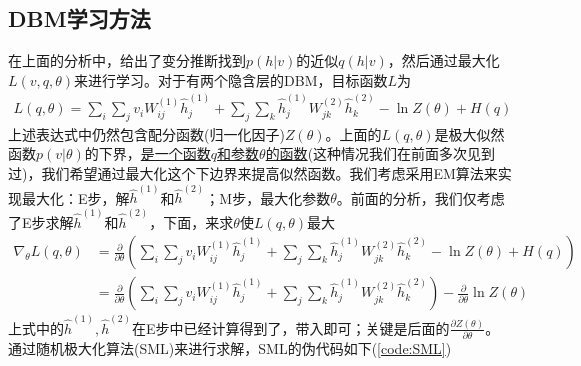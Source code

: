     \subsection{DBM学习方法}
        \par
        在上面的分析中，给出了变分推断找到$p(h|v)$的近似$q(h|v)$，然后通过最大化$L(v,q,\theta)$来进行学习。对于有两个隐含层的DBM，目标函数$L$为
        \begin{align*}
        L(q,\theta) = \sum_i\sum_j v_iW_{i{j}}^{(1)}\hat{h}_j^{(1)} + \sum_j\sum_k\hat{h}_j^{(1)} W_{jk}^{(2)} \hat{h}_k^{(2)} - \ln Z(\theta) + H(q)
        \end{align*}
        上述表达式中仍然包含配分函数(归一化因子)$Z(\theta)$。上面的$L(q,\theta)$是极大似然函数$p(v|\theta)$的下界，\underline{是一个函数$q$和参数$\theta$的函数}(这种情况我们在前面多次见到过)，我们希望通过最大化这个下边界来提高似然函数。我们考虑采用EM算法来实现最大化：E步，解$\hat{h}^{(1)}$和$\hat{h}^{(2)}$；M步，最大化参数$\theta$。前面的分析，我们仅考虑了E步求解$\hat{h}^{(1)}$和$\hat{h}^{(2)}$，下面，来求$\theta$使$L(q,\theta)$最大
        \begin{align*}
        \nabla _\theta L(q,\theta) & = \frac{\partial }{\partial \theta} \left(\sum_i\sum_j v_iW_{i{j}}^{(1)}\hat{h}_j^{(1)} + \sum_j\sum_k\hat{h}_j^{(1)} W_{jk}^{(2)} \hat{h}_k^{(2)} - \ln Z(\theta) + H(q)\right) \\
        & = \frac{\partial }{\partial \theta} \left( \sum_i\sum_j v_iW_{i{j}}^{(1)}\hat{h}_j^{(1)} + \sum_j\sum_k\hat{h}_j^{(1)} W_{jk}^{(2)} \hat{h}_k^{(2)}  \right) -\frac{\partial }{\partial \theta} \ln Z(\theta)
        \end{align*}
        上式中的$\hat{h}^{(1)},\hat{h}^{(2)}$在E步中已经计算得到了，带入即可；关键是后面的$\frac{\partial Z(\theta)}{\partial \theta}$。通过随机极大化算法(SML)来进行求解，SML的伪代码如下(\ref{code:SML})

